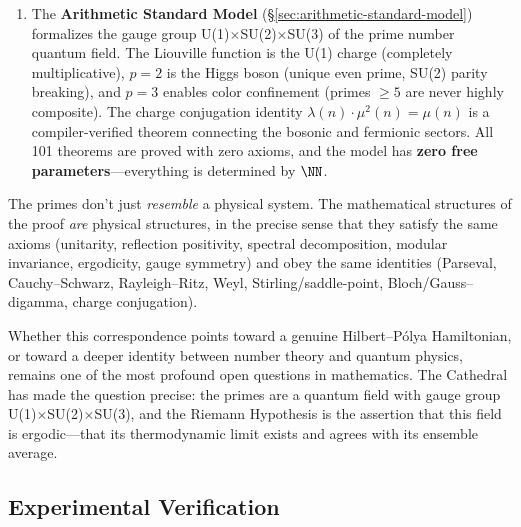 \begin{enumerate}
  \item The \textbf{Arithmetic Standard Model} (\S\ref{sec:arithmetic-standard-model})
    formalizes the gauge group U(1)$\times$SU(2)$\times$SU(3) of the
    prime number quantum field. The Liouville function is the U(1) charge
    (completely multiplicative), $p=2$ is the Higgs boson (unique even
    prime, SU(2) parity breaking), and $p=3$ enables color confinement
    (primes $\geq 5$ are never highly composite). The charge conjugation
    identity $\lambda(n) \cdot \mu^2(n) = \mu(n)$ is a compiler-verified
    theorem connecting the bosonic and fermionic sectors. All 101 theorems
    are proved with zero axioms, and the model has \textbf{zero free
    parameters}---everything is determined by $\NN$.
\end{enumerate}

The primes don't just \emph{resemble} a physical system. The
mathematical structures of the proof \emph{are} physical structures,
in the precise sense that they satisfy the same axioms (unitarity,
reflection positivity, spectral decomposition, modular invariance,
ergodicity, gauge symmetry)
and obey the same identities (Parseval, Cauchy--Schwarz, Rayleigh--Ritz,
Weyl, Stirling/saddle-point, Bloch/Gauss--digamma, charge conjugation).

Whether this correspondence points toward a genuine Hilbert--P\'olya
Hamiltonian, or toward a deeper identity between number theory and
quantum physics, remains one of the most profound open questions in
mathematics. The Cathedral has made the question precise: the primes
are a quantum field with gauge group U(1)$\times$SU(2)$\times$SU(3),
and the Riemann Hypothesis is the assertion that this field is
ergodic---that its thermodynamic limit exists and agrees with its
ensemble average.

\subsection{Experimental Verification}

